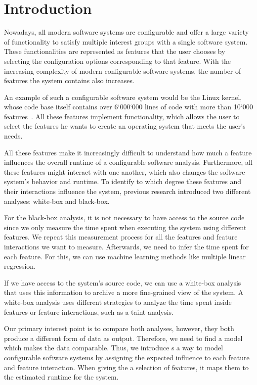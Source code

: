 \chapter{Introduction}\label{ch:introduction}

Nowadays, all modern software systems are configurable and offer a large variety of functionality to satisfy multiple 
interest groups with a single software system. These functionalities are represented as features that the user chooses by selecting the 
configuration options corresponding to that feature. With the increasing complexity of modern configurable software systems, 
the number of features the system contains also increases.

An example of such a configurable software system would be the Linux kernel, whose
code base itself contains over 6‘000‘000 lines of code with more than 10‘000 features~\cite{Linux-Kernel}.
All these features implement functionality, which allows the user to select the features he
wants to create an operating system that meets the user’s needs.

All these features make it increasingly difficult to understand how much a feature influences the overall runtime of a configurable software 
analysis. Furthermore, all these features might interact with one another, which also changes the software system's behavior and runtime. 
To identify to which degree these features and their interactions influence the system, previous research introduced two different analyses: 
white-box and black-box.

For the black-box analysis, 
it is not necessary to have access to the source code since we only measure the time spent when executing the system using different features. 
We repeat this measurement process for all the features and feature interactions we want to measure. 
Afterwards, we need to infer the time spent for each feature. For this, we can use machine learning methods like multiple linear regression. 

If we have access to the system's source code, we can use a white-box analysis that uses this information to archive a more fine-grained 
view of the system. A white-box analysis uses different strategies to analyze the time spent inside features or feature interactions, 
such as a taint analysis.

Our primary interest point is to compare both analyses, however, they both produce a different form of data as output. 
Therefore, we need to find a model which makes the data comparable. 
Thus, we introduce {\perfInfluenceModel}s a way to model configurable software systems by assigning the expected influence to each feature 
and feature interaction. When giving the {\perfInfluenceModel} a selection of features, it maps them to the estimated runtime for the system.

